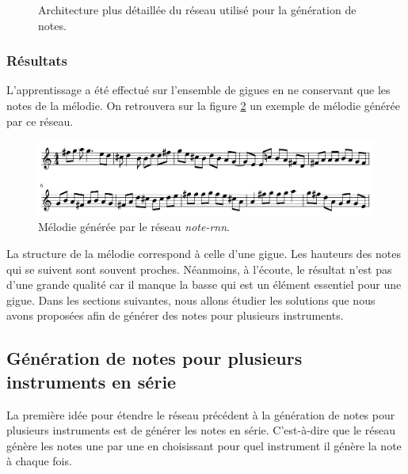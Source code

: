 \begin{figure}[h!]
\begin{center}

\caption{Architecture plus détaillée du réseau utilisé pour la génération de notes.}
\label{note_rnn}
\end{center}
\end{figure}

\subsubsection{Résultats}

L'apprentissage a été effectué sur l'ensemble de gigues en ne conservant que les notes de la mélodie. On retrouvera sur la figure \ref{result_note_rnn} un exemple de mélodie générée par ce réseau.

\begin{figure}[h!]
\begin{center}
\includegraphics[scale=0.3]{images/chapter9/note_rnn_result.png}
\caption{Mélodie générée par le réseau \textit{note-rnn}.}
\label{result_note_rnn}
\end{center}
\end{figure}

La structure de la mélodie correspond à celle d'une gigue. Les hauteurs des notes qui se suivent sont souvent proches. Néanmoins, à l'écoute, le résultat n'est pas d'une grande qualité car il manque la basse qui est un élément essentiel pour une gigue. Dans les sections suivantes, nous allons étudier les solutions que nous avons proposées afin de générer des notes pour plusieurs instruments.

\subsection{Génération de notes pour plusieurs instruments en série}

La première idée pour étendre le réseau précédent à la génération de notes pour plusieurs instruments est de générer les notes en série. C'est-à-dire que le réseau génère les notes une par une en choisissant pour quel instrument il génère la note à chaque fois.

